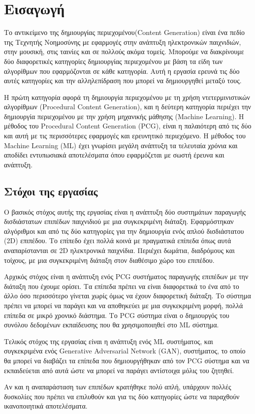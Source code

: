 \chapter{Εισαγωγή}

\par
Το αντικείμενο της δημιουργίας περιεχομένου(Content Generation) είναι ένα πεδίο της Τεχνητής Νοημοσύνης με εφαρμογές στην ανάπτυξη ηλεκτρονικών παιχνιδιών, στην μουσική, στις ταινίες και σε πολλούς ακόμα τομείς. Μπορούμε να διακρίνουμε δύο διαφορετικές κατηγορίες δημιουργίας περιεχομένου με βάση τα είδη των αλγορίθμων που εφαρμόζονται σε κάθε κατηγορία. Αυτή η εργασία ερευνά τις δύο αυτές κατηγορίες και την αλληλεπίδραση που μπορεί να δημιουργηθεί μεταξύ τους.
\par
Η πρώτη κατηγορία αφορά τη δημιουργία περιεχομένου με τη χρήση ντετερμινιστικών αλγορίθμων (Procedural Content Generation), και η δεύτερη κατηγορία περιέχει την δημιουργία περιεχομένου με την χρήση μηχανικής μάθησης (Machine Learning). Η μέθοδος του Procedural Content Generation (PCG), είναι η παλαιότερη από τις δύο και αυτή με τις περισσότερες εφαρμογές και ερευνητικό περιεχόμενο. Η μέθοδος του Machine Learning (ML) έχει γνωρίσει μεγάλη ανάπτυξη τα τελευταία χρόνια και αποδίδει εντυπωσιακά αποτελέσματα όπου εφαρμόζεται με σωστή έρευνα και ανάπτυξη.

\section{Στόχοι της εργασίας}
\par
Ο βασικός στόχος αυτής της εργασίας είναι η ανάπτυξη δύο συστημάτων παραγωγής δισδιάστατων επιπέδων παιχνιδιού με μια συγκεκριμένη διάταξη. Εφαρμόστηκαν αλγόριθμοι και από τις δύο κατηγορίες για την δημιουργία ενός απλού δισδιάστατου (2D) επιπέδου. Το επίπεδο έχει πολλά κοινά με πραγματικά επίπεδα όπως αυτά αναπαρίστανται σε 2D ηλεκτρονικά παιχνίδια. Περιέχει δωμάτια, διαδρόμους και τοίχους, με μια συγκεκριμένη διάταξη στον διαθέσιμο χώρο του επιπέδου.
\par
Αρχικός στόχος είναι η ανάπτυξη ενός PCG συστήματος παραγωγής επιπέδων με την διάταξη που έχουμε ορίσει. Τα επίπεδα πρέπει να είναι διαφορετικά το ένα από το άλλο όσο περισσότερο γίνεται χωρίς όμως να έχουν διαφορετική διάταξη. Το σύστημα πρέπει να μπορεί να παράγει και να αποθηκεύει με μια συγκεκριμένη μορφή, πολλά επίπεδα σε μικρό χρονικό διάστημα. Το PCG σύστημα είναι ο δημιουργός του συνόλου δεδομένων εκπαίδευσης που θα χρησιμοποιηθεί στο ML σύστημα.
\par
Τελικός στόχος της εργασίας είναι η ανάπτυξη ενός ML συστήματος, και συγκεκριμένα ενός Generative Adversarial Network (GAN), συστήματος, το οποίο θα μπορεί να διαβάζει τα επίπεδα που δημιουργήθηκαν από τον PCG σύστημα και να εκπαιδεύεται από αυτά ώστε να μπορεί να παράγει αντίστοιχα μόλις του ζητηθεί.
\par
Αν και η αναπαράσταση των επιπέδων κρατήθηκε πολύ απλή, υπάρχουν πολλές δυσκολίες που πρέπει να επιλυθούν και για τις δύο κατηγορίες ώστε να παραχθούν ικανοποιητικά αποτελέσματα.

